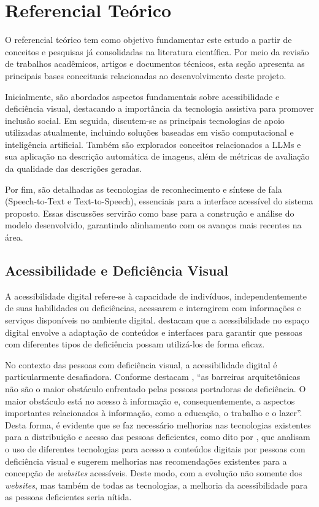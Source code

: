 \chapter{Referencial Teórico}  \label{cap:02}

O referencial teórico tem como objetivo fundamentar este estudo a partir de conceitos e pesquisas já consolidadas na literatura científica. Por meio da revisão de trabalhos acadêmicos, artigos e documentos técnicos, esta seção apresenta as principais bases conceituais relacionadas ao desenvolvimento deste projeto.

Inicialmente, são abordados aspectos fundamentais sobre acessibilidade e deficiência visual, destacando a importância da tecnologia assistiva para promover inclusão social. Em seguida, discutem-se as principais tecnologias de apoio utilizadas atualmente, incluindo soluções baseadas em visão computacional e inteligência artificial. Também são explorados conceitos relacionados a LLMs e sua aplicação na descrição automática de imagens, além de métricas de avaliação da qualidade das descrições geradas.

Por fim, são detalhadas as tecnologias de reconhecimento e síntese de fala (Speech-to-Text e Text-to-Speech), essenciais para a interface acessível do sistema proposto. Essas discussões servirão como base para a construção e análise do modelo desenvolvido, garantindo alinhamento com os avanços mais recentes na área.

\section{Acessibilidade e Deficiência Visual}

A acessibilidade digital refere-se à capacidade de indivíduos, independentemente de suas habilidades ou deficiências, acessarem e interagirem com informações e serviços disponíveis no ambiente digital.  destacam que a acessibilidade no espaço digital envolve a adaptação de conteúdos e interfaces para garantir que pessoas com diferentes tipos de deficiência possam utilizá-los de forma eficaz.

No contexto das pessoas com deficiência visual, a acessibilidade digital é particularmente desafiadora. Conforme destacam , “as barreiras arquitetônicas não são o maior obstáculo enfrentado pelas pessoas portadoras de deficiência. O maior obstáculo está no acesso à informação e, consequentemente, a aspectos importantes relacionados à informação, como a educação, o trabalho e o lazer”. Desta forma, é evidente que se faz necessário melhorias nas tecnologias existentes para a distribuição e acesso das pessoas deficientes, como dito por , que analisam o uso de diferentes tecnologias para acesso a conteúdos digitais por pessoas com deficiência visual e sugerem melhorias nas recomendações existentes para a concepção de \textit{websites} acessíveis. Deste modo, com a evolução não somente dos \textit{websites}, mas também de todas as tecnologias, a melhoria da acessibilidade para as pessoas deficientes seria nítida.

